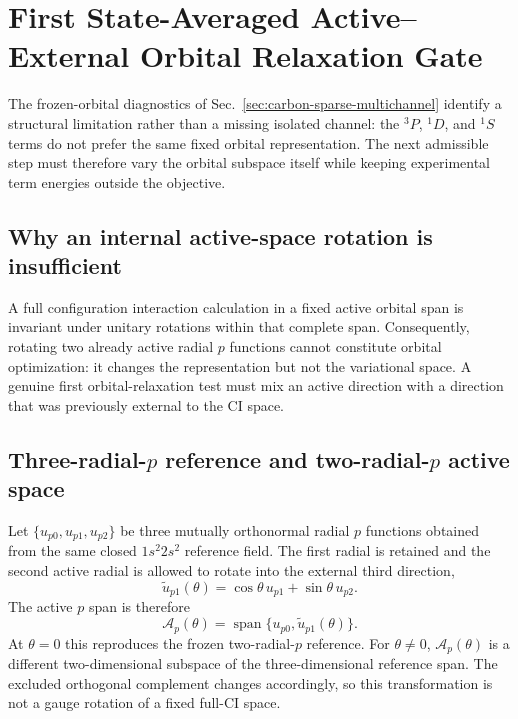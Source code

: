 \section{First State-Averaged Active--External Orbital Relaxation Gate}
\label{sec:carbon-state-averaged-p-relaxation}

The frozen-orbital diagnostics of Sec.~\ref{sec:carbon-sparse-multichannel} identify a structural limitation rather than a missing isolated channel: the $^3P$, $^1D$, and $^1S$ terms do not prefer the same fixed orbital representation.  The next admissible step must therefore vary the orbital subspace itself while keeping experimental term energies outside the objective.

\subsection{Why an internal active-space rotation is insufficient}
A full configuration interaction calculation in a fixed active orbital span is invariant under unitary rotations within that complete span.  Consequently, rotating two already active radial $p$ functions cannot constitute orbital optimization: it changes the representation but not the variational space.  A genuine first orbital-relaxation test must mix an active direction with a direction that was previously external to the CI space.

\subsection{Three-radial-$p$ reference and two-radial-$p$ active space}
Let $\{u_{p0},u_{p1},u_{p2}\}$ be three mutually orthonormal radial $p$ functions obtained from the same closed $1s^2 2s^2$ reference field.  The first radial is retained and the second active radial is allowed to rotate into the external third direction,
\begin{equation}
\widetilde u_{p1}(\theta)=\cos\theta\,u_{p1}+\sin\theta\,u_{p2}.
\end{equation}
The active $p$ span is therefore
\begin{equation}
\mathcal A_p(\theta)=\operatorname{span}\{u_{p0},\widetilde u_{p1}(\theta)\}.
\end{equation}
At $\theta=0$ this reproduces the frozen two-radial-$p$ reference.  For $\theta\neq0$, $\mathcal A_p(\theta)$ is a different two-dimensional subspace of the three-dimensional reference span.  The excluded orthogonal complement changes accordingly, so this transformation is not a gauge rotation of a fixed full-CI space.

